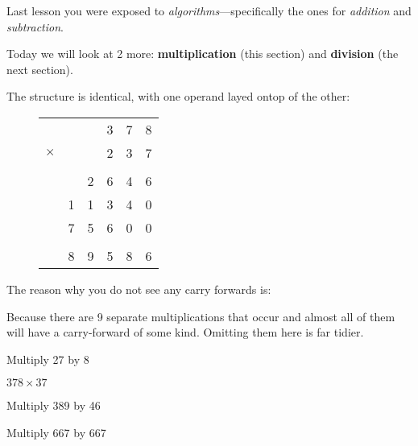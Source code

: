 Last lesson you were exposed to \emph{algorithms}---specifically the ones for \textsl{addition} and \textsl{subtraction}.

Today we will look at 2 more: \textbf{multiplication} (this section) and \textbf{division} (the next section).

The structure is identical, with one operand layed ontop of the other:
\begin{figure}
    \centering
\begin{tabular}{cccccc}
     & & &3&7&8\\
    $\times$& & &2&3&7\\
    \hline\\
     & &2&6&4&6\\
     &1&1&3&4&0\\
     &7&5&6&0&0\\
    \hline\\
     &8&9&5&8&6
\end{tabular}
\end{figure}

The reason why you do not see any carry forwards is:
\begin{solutionordottedlines}[1in]
    Because there are 9 separate multiplications that occur and almost all of them will have a carry-forward of some kind.
    Omitting them here is far tidier.
\end{solutionordottedlines}

\begin{examples}
    \begin{questions}
        \Question[1] Multiply 27 by 8
        \begin{solutionorbox}[1in]
        \end{solutionorbox}
        \Question[1] \(378 \times 37\)
        \begin{solutionorbox}[1in]
        \end{solutionorbox}
        \Question[2] Multiply 389 by 46
        \begin{solutionorbox}[1.5in]
        \end{solutionorbox}
        \Question[2] Multiply 667 by 667
        \begin{solutionorbox}[1.5in]
        \end{solutionorbox}
    \end{questions}
\end{examples}


